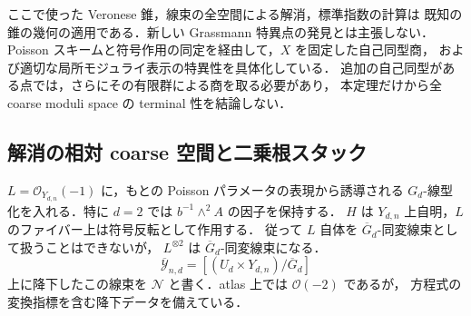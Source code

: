 \begin{remark}
ここで使った Veronese 錐，線束の全空間による解消，標準指数の計算は
既知の錐の幾何の適用である．新しい Grassmann 特異点の発見とは主張しない．
Poisson スキームと符号作用の同定を経由して，$X$ を固定した自己同型商，
および適切な局所モジュライ表示の特異性を具体化している．
追加の自己同型がある点では，さらにその有限群による商を取る必要があり，
本定理だけから全 coarse moduli space の terminal 性を結論しない．
\end{remark}

\subsection{解消の相対 coarse 空間と二乗根スタック}

$L=\mathcal O_{Y_{d,n}}(-1)$ に，もとの Poisson パラメータの表現から誘導される
$G_d$-線型化を入れる．特に $d=2$ では $b^{-1}\wedge^2A$ の因子を保持する．
$H$ は $Y_{d,n}$ 上自明，$L$ のファイバー上は符号反転として作用する．
従って $L$ 自体を $\overline G_d$-同変線束として扱うことはできないが，
$L^{\otimes2}$ は $\overline G_d$-同変線束になる．
\[
 \overline{\mathcal Y}_{n,d}=[(U_d\times Y_{d,n})/\overline G_d]
\]
上に降下したこの線束を $\mathcal N$ と書く．atlas 上では $\mathcal O(-2)$ であるが，
方程式の変換指標を含む降下データを備えている．

